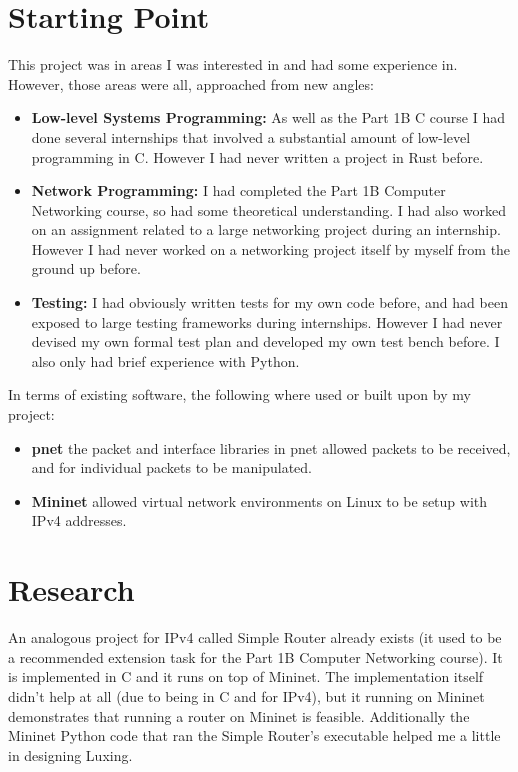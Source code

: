 \documentclass[12pt,a4paper,twoside,openright]{report}
\begin{document}
\section{Starting Point}
This project was in areas I was interested in and had some experience in. However, those areas were all, approached from new angles:
\begin{itemize}
\item \textbf{Low-level Systems Programming:} As well as the Part 1B C course I had done several internships that involved a substantial amount of low-level programming in C. However I had never written a project in Rust before.
\item \textbf{Network Programming:} I had completed the Part 1B Computer Networking course, so had some theoretical understanding.  I had also worked on an assignment related to a large networking project during an internship.  However I had never worked on a networking project itself by myself from the ground up before.
\item \textbf{Testing:} I had obviously written tests for my own code before, and had been exposed to large testing frameworks during internships.  However I had never devised my own formal test plan and developed my own test bench before. I also only had brief experience with Python.
\end{itemize}
In terms of existing software, the following where used or built upon by my project:
\begin{itemize}
\item \textbf{pnet}\cite{pnet_rust} the packet and interface libraries in pnet allowed packets to be received, and for individual packets to be manipulated.
\item \textbf{Mininet}\cite{mininet} allowed virtual network environments on Linux to be setup with IPv4 addresses.
\end{itemize}

\section{Research}
An analogous project for IPv4 called Simple Router already exists\cite{simple_router} (it used to be a recommended extension task for the Part 1B Computer Networking course).  It is implemented in C and it runs on top of Mininet.  The implementation itself didn't help at all (due to being in C and for IPv4), but it running on Mininet demonstrates that running a router on Mininet is feasible.  Additionally the Mininet Python code that ran the Simple Router's executable helped me a little in designing Luxing.
\end{document}
